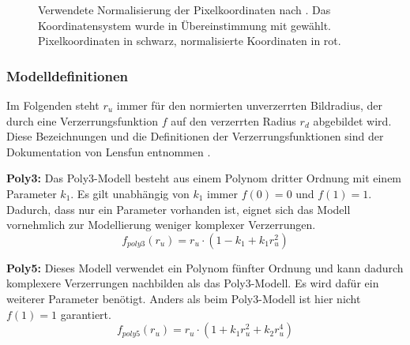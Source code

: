\begin{figure}[h]
	\centering
	
	\caption{Verwendete Normalisierung der Pixelkoordinaten nach \cite{imatest, lensfun}. Das Koordinatensystem wurde in Übereinstimmung mit \cite[S. 359]{pbrt_book} gewählt. Pixelkoordinaten in schwarz, normalisierte Koordinaten in rot.	\label{fig:normalisation}}
	\label{fig:norm}
\end{figure}

\newpage
\subsubsection{Modelldefinitionen}\label{sec:Modeldefinitions}
\label{subsubsec:modeldef}

Im Folgenden steht $r_u$ immer für den normierten unverzerrten Bildradius, der durch eine Verzerrungsfunktion $f$ auf den verzerrten Radius $r_d$ abgebildet wird. Diese Bezeichnungen und die Definitionen der Verzerrungsfunktionen sind der Dokumentation von Lensfun entnommen \cite{lensfun}.

\textbf{Poly3:} Das Poly3-Modell besteht aus einem Polynom dritter Ordnung mit einem Parameter $k_1$. Es gilt unabhängig von $k_1$ immer $f(0) = 0$ und $f(1) = 1$. Dadurch, dass nur ein Parameter vorhanden ist, eignet sich das Modell vornehmlich zur Modellierung weniger komplexer Verzerrungen.
\begin{equation}
	f_{poly3}(r_u) = r_u \cdot (1 - k_1 + k_1 r_u^2)
\end{equation}

\textbf{Poly5:} Dieses Modell verwendet ein Polynom fünfter Ordnung und kann dadurch komplexere Verzerrungen nachbilden als das Poly3-Modell. Es wird dafür ein weiterer Parameter benötigt. Anders als beim Poly3-Modell ist hier nicht $f(1) = 1$ garantiert.
\begin{equation}
	f_{poly5}(r_u) = r_u \cdot (1 + k_1 r_u^2 + k_2 r_u^4)
\end{equation}


